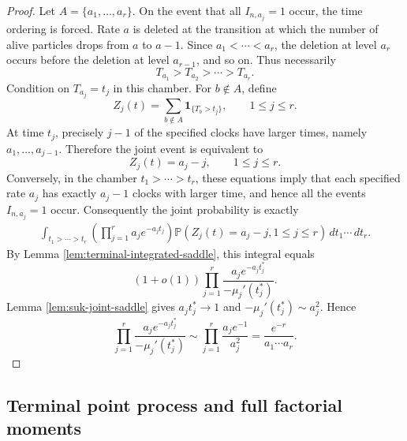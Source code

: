 \documentclass[11pt]{article}
\theoremstyle{remark}
\newcommand{\Pp}{\mathbb P}
\newcommand{\one}{\mathbf 1}
\newcommand{\dd}{\,d}
\begin{document}
\begin{proof}
Let \(A=\{a_1,\ldots,a_r\}\).  On the event that all \(I_{n,a_j}=1\) occur, the time ordering is forced.  Rate \(a\) is deleted at the transition at which the number of alive particles drops from \(a\) to \(a-1\).  Since \(a_1<\cdots<a_r\), the deletion at level \(a_r\) occurs before the deletion at level \(a_{r-1}\), and so on.  Thus necessarily
\[
        T_{a_1}>T_{a_2}>\cdots>T_{a_r}.
\]
Condition on \(T_{a_j}=t_j\) in this chamber.  For \(b\notin A\), define
\[
        Z_j(t)=\sum_{b\notin A}\one_{\{T_b>t_j\}},
        \qquad 1\le j\le r.
\]
At time \(t_j\), precisely \(j-1\) of the specified clocks have larger times, namely \(a_1,\ldots,a_{j-1}\).  Therefore the joint event is equivalent to
\[
        Z_j(t)=a_j-j,
        \qquad 1\le j\le r.
\]
Conversely, in the chamber \(t_1>\cdots>t_r\), these equations imply that each specified rate \(a_j\) has exactly \(a_j-1\) clocks with larger time, and hence all the events \(I_{n,a_j}=1\) occur.  Consequently the joint probability is exactly
\[
\begin{aligned}
\int_{t_1>\cdots>t_r}
        \left(\prod_{j=1}^r a_j e^{-a_j t_j}\right)
        \Pp(Z_j(t)=a_j-j,
        1\le j\le r)
        \dd t_1\cdots\dd t_r .
\end{aligned}
\]
By Lemma \ref{lem:terminal-integrated-saddle}, this integral equals
\[
        (1+o(1))
        \prod_{j=1}^r
        \frac{a_j e^{-a_jt_j^*}}{-\mu_j'(t_j^*)}.
\]
Lemma \ref{lem:suk-joint-saddle} gives \(a_jt_j^*\to1\) and \(-\mu_j'(t_j^*)\sim a_j^2\).  Hence
\[
        \prod_{j=1}^r
        \frac{a_j e^{-a_jt_j^*}}{-\mu_j'(t_j^*)}
        \sim
        \prod_{j=1}^r\frac{a_je^{-1}}{a_j^2}
        =\frac{e^{-r}}{a_1\cdots a_r}.
\]
\end{proof}

\subsection{Terminal point process and full factorial moments}
\end{document}
